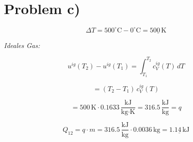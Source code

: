 \section*{Problem c)}

\[
\Delta T = 500^\circ \text{C} - 0^\circ \text{C} = \underline{500 \, \text{K}}
\]

\textit{Ideales Gas:}

\[
u^{ig}(T_2) - u^{ig}(T_1) = \int_{T_1}^{T_2} c_V^{ig}(T) \, dT
\]

\[
= (T_2 - T_1) \, c_V^{ig}(T)
\]

\[
= 500 \, \text{K} \cdot 0.1633 \, \frac{\text{kJ}}{\text{kg} \cdot \text{K}} = 316.5 \, \frac{\text{kJ}}{\text{kg}} = q
\]

\[
Q_{12} = q \cdot m = 316.5 \, \frac{\text{kJ}}{\text{kg}} \cdot 0.0036 \, \text{kg} = \underline{1.14 \, \text{kJ}}
\]